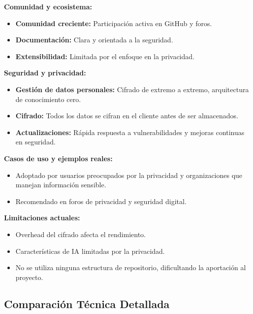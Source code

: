 \textbf{Comunidad y ecosistema:}
\begin{itemize}
    \item \textbf{Comunidad creciente:} Participación activa en GitHub y foros.
    \item \textbf{Documentación:} Clara y orientada a la seguridad.
    \item \textbf{Extensibilidad:} Limitada por el enfoque en la privacidad.
\end{itemize}

\textbf{Seguridad y privacidad:}
\begin{itemize}
    \item \textbf{Gestión de datos personales:} Cifrado de extremo a extremo, arquitectura de conocimiento cero.
    \item \textbf{Cifrado:} Todos los datos se cifran en el cliente antes de ser almacenados.
    \item \textbf{Actualizaciones:} Rápida respuesta a vulnerabilidades y mejoras continuas en seguridad.
\end{itemize}

\textbf{Casos de uso y ejemplos reales:}
\begin{itemize}
    \item Adoptado por usuarios preocupados por la privacidad y organizaciones que manejan información sensible.
    \item Recomendado en foros de privacidad y seguridad digital.
\end{itemize}

\textbf{Limitaciones actuales:}
\begin{itemize}
    \item Overhead del cifrado afecta el rendimiento.
    \item Características de IA limitadas por la privacidad.
    \item No se utiliza ninguna estructura de repositorio, dificultando la aportación al proyecto.
\end{itemize}

\subsection{Comparación Técnica Detallada}

